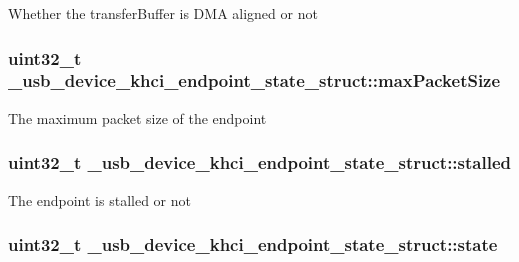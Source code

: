 Whether the transfer\-Buffer is D\-M\-A aligned or not \hypertarget{struct__usb__device__khci__endpoint__state__struct_aa9228ee70dadeb0584e652e3b6e8dcb2}{
\subsubsection[{max\-Packet\-Size}]{\setlength{\rightskip}{0pt plus 5cm}uint32\-\_\-t \-\_\-usb\-\_\-device\-\_\-khci\-\_\-endpoint\-\_\-state\-\_\-struct\-::max\-Packet\-Size}}\label{struct__usb__device__khci__endpoint__state__struct_aa9228ee70dadeb0584e652e3b6e8dcb2}
The maximum packet size of the endpoint \hypertarget{struct__usb__device__khci__endpoint__state__struct_a4f07e1c2d1643df7641cda546131d526}{
\subsubsection[{stalled}]{\setlength{\rightskip}{0pt plus 5cm}uint32\-\_\-t \-\_\-usb\-\_\-device\-\_\-khci\-\_\-endpoint\-\_\-state\-\_\-struct\-::stalled}}\label{struct__usb__device__khci__endpoint__state__struct_a4f07e1c2d1643df7641cda546131d526}
The endpoint is stalled or not \hypertarget{struct__usb__device__khci__endpoint__state__struct_af702fd79b2f9e9335d762a7225e6471d}{
\subsubsection[{state}]{\setlength{\rightskip}{0pt plus 5cm}uint32\-\_\-t \-\_\-usb\-\_\-device\-\_\-khci\-\_\-endpoint\-\_\-state\-\_\-struct\-::state}}\label{struct__usb__device__khci__endpoint__state__struct_af702fd79b2f9e9335d762a7225e6471d}
